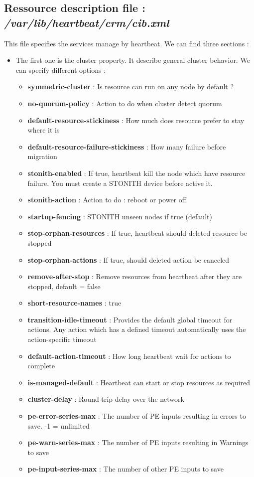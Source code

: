 \documentclass[a4paper,10pt]{report}
\begin{document}
\subsection{Ressource description file : \textit{/var/lib/heartbeat/crm/cib.xml}}
This file specifies the services manage by heartbeat. We can find three sections :
\begin{itemize}
\item The first one is the cluster property. It describe general cluster behavior. We can specify different options :

\begin{itemize}
\item \textbf{symmetric-cluster} : Is resource can run on any node by default ?
\item \textbf{no-quorum-policy} : Action to do when cluster detect quorum
\item \textbf{default-resource-stickiness} : How much does resource prefer to stay where it is
\item \textbf{default-resource-failure-stickiness} : How many failure before migration
\item \textbf{stonith-enabled} : If true, heartbeat kill the node which have resource failure. You must create a STONITH device before active it.
\item \textbf{stonith-action} : Action to do : reboot or power off
\item \textbf{startup-fencing} : STONITH unseen nodes if true (default)
\item \textbf{stop-orphan-resources} : If true, heartbeat should deleted resource be stopped
\item \textbf{stop-orphan-actions} : If true, should deleted action be canceled
\item \textbf{remove-after-stop} : Remove resources from heartbeat after they are stopped, default = false
\item \textbf{short-resource-names} : true
\item \textbf{transition-idle-timeout} : Provides the default global timeout for actions. Any action which has a defined timeout automatically
uses the action-specific timeout
\item \textbf{default-action-timeout} : How long heartbeat wait for actions to complete
\item \textbf{is-managed-default} : Heartbeat can start or stop resources as required
\item \textbf{cluster-delay} : Round trip delay over the network
\item \textbf{pe-error-series-max} : The number of PE inputs resulting in errors to save. -1 = unlimited
\item \textbf{pe-warn-series-max} : The number of PE inputs resulting in Warnings to save
\item \textbf{pe-input-series-max} : The number of other PE inputs to save
\end{itemize}


\end{itemize}
\end{document}
